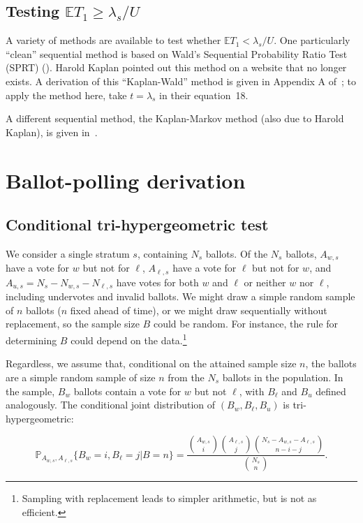 \documentclass[runningheads]{llncs}
\begin{document}
\subsection{Testing $\mathbb{E} T_1 \ge \lambda_s/U$}

A variety of methods are available to test whether $\mathbb{E} T_1 < \lambda_s/U$.
One particularly ``clean'' sequential method is based on Wald's Sequential Probability
Ratio Test (SPRT) (\cite{wald45}).
Harold Kaplan pointed out this method on a website that no longer exists.
A derivation of this ``Kaplan-Wald'' method is given in Appendix A of~\cite{starkTeague14};
to apply the method here, take $t = \lambda_s$ in their equation~18.

A different sequential method, the Kaplan-Markov method (also due to Harold Kaplan), 
is given in~\cite{stark09b}.




\section{Ballot-polling derivation}\label{sec:appendix-polling}
\subsection{Conditional tri-hypergeometric test}

We consider a single stratum $s$, containing $N_s$ ballots.
Of the $N_s$ ballots,
$A_{w,s}$ have a vote for $w$ but not for $\ell$, $A_{\ell,s}$ have a vote for $\ell$ but not for $w$, and $A_{u,s} = N_s - N_{w,s} - N_{\ell,s}$ have votes for both $w$ and $\ell$ or neither $w$ nor $\ell$, including undervotes and invalid ballots.
We might draw a simple random sample of $n$ ballots ($n$ fixed ahead of time), or we might draw 
sequentially without replacement, so the sample size $B$ could be random.
For instance, the rule for determining $B$ could depend on the data.\footnote{%
   Sampling with replacement leads to simpler arithmetic, but is not as efficient.
}

Regardless, we assume that, conditional on the attained sample size $n$, the ballots are a simple random sample of size $n$ from the $N_s$ ballots in the population.
In the sample, $B_w$ ballots contain a vote for $w$ but not $\ell$, with $B_\ell$ and $B_u$ defined analogously.
The conditional joint distribution of
$(B_w, B_\ell, B_u)$ is tri-hypergeometric: 

\begin{equation}
    \mathbb{P}_{A_{w,s}, A_{\ell,s}} \{ B_w = i, B_\ell = j \vert B=n \} = 
     \frac{ {A_{w,s } \choose i}{A_{\ell,s} \choose j}{N_s - A_{w,s} - A_{\ell,s} \choose n-i-j}}{{N_s \choose n}}.
\end{equation}
\end{document}

